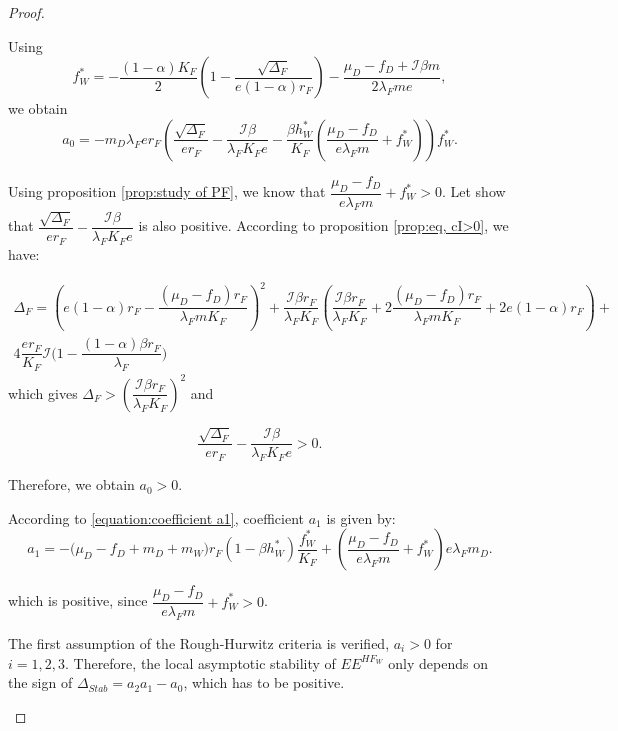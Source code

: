 \documentclass{article}
\newcommand{\lfw}{\lambda_{F}}
\newcommand{\lfw}{\lambda_{F}}
\newcommand{\cI}{\mathcal{I}}
\theoremstyle{definition}
\theoremstyle{remark}
\begin{document}
\begin{proof}
\begin{itemize}
Using
\begin{equation*}
f_W^* = -\dfrac{(1-\alpha)K_F}{2}\left(1 - \dfrac{\sqrt{\Delta_F}}{e(1-\alpha)r_F}\right) - \dfrac{\mu_D - f_D + \cI \beta m}{2\lfw m e},
\end{equation*}
we obtain
\begin{equation*}
a_0 = - m_D \lfw e r_F \left(\dfrac{\sqrt{\Delta_F}}{er_F} - \dfrac{\cI \beta}{\lfw K_F e} -  \dfrac{\beta h_W^*}{K_F} \left(\dfrac{\mu_D -f_D }{e \lfw m} + f_W^*\right)\right)  f^*_{W}.
\end{equation*}

Using proposition \ref{prop:study of PF}, we know that $\dfrac{\mu_D -f_D }{e \lfw m} + f_W^* > 0$. Let show that  $\dfrac{\sqrt{\Delta_F}}{er_F} - \dfrac{\cI \beta}{\lfw K_F e}$ is also positive. According to proposition \ref{prop:eq, cI>0}, we have:

\begin{multline*}
\Delta_F = \left(e(1-\alpha)r_F - \dfrac{(\mu_D - f_D) r_F}{\lfw m K_F}\right)^2 + \dfrac{\cI \beta r_F}{\lfw K_F} \left(\dfrac{\cI \beta r_F}{\lfw K_F} + 2\dfrac{(\mu_D - f_D) r_F}{\lfw m K_F} + 2e(1-\alpha)r_F \right) + \\ 4\dfrac{er_F}{K_F}  \cI\Big(1 - \dfrac{(1-\alpha)\beta r_F}{\lfw} \Big)
\end{multline*}
 which gives $\Delta_F > \left(\dfrac{\cI \beta r_F}{\lfw K_F}\right)^2$ and

\begin{equation*}
\dfrac{\sqrt{\Delta_F}}{er_F} - \dfrac{\cI \beta}{\lfw K_F e} > 0.
\end{equation*}

Therefore, we obtain $a_0 > 0$.

According to \eqref{equation:coefficient a1}, coefficient $a_1$ is given by:
\begin{equation*}
a_1 = -\big( \mu_D  -f_D + m_D + m_W) r_F(1 - \beta h_W^*) \dfrac{f^*_W}{K_F} + \left(\dfrac{\mu_D -f_D}{e\lfw m} + f_W^*\right) e \lfw m_D .
\end{equation*}

which is positive, since  $\dfrac{\mu_D - f_D}{e \lfw m} +  f^*_{W} > 0$.

The first assumption of the Rough-Hurwitz criteria is verified, $a_i > 0$ for $i=1,2,3$. Therefore, the local asymptotic stability of $EE^{HF_W}$ only depends on the sign of $\Delta_{Stab}= a_2 a_1 - a_0$, which has to be positive.
\end{itemize}
\end{proof}
\end{document}
